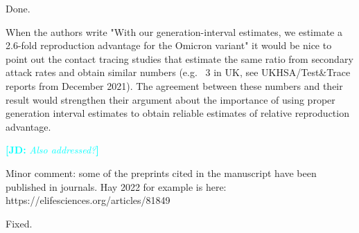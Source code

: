 \documentclass[12pt]{article}
\newcommand{\revtext}{\textsf}
\newcommand{\comment}[3]{\textcolor{#1}{\textbf{[#2: }\textsl{#3}\textbf{]}}}
\newcommand{\jd}[1]{\comment{cyan}{JD}{#1}}
\begin{document}
Done.

\revtext{When the authors write 
"With our generation-interval estimates, we estimate a 2.6-fold reproduction advantage for the Omicron variant" 
it would be nice to point out the contact tracing studies that estimate the same ratio from secondary attack rates and obtain similar numbers (e.g. ~3 in UK, see UKHSA/Test&Trace reports from December 2021). The agreement between these numbers and their result would strengthen their argument about the importance of using proper generation interval estimates to obtain reliable estimates of relative reproduction advantage.}

\jd{Also addressed?}

\revtext{Minor comment: some of the preprints cited in the manuscript have been published in journals. Hay 2022 for example is here: https://elifesciences.org/articles/81849}

Fixed.
\end{document}
